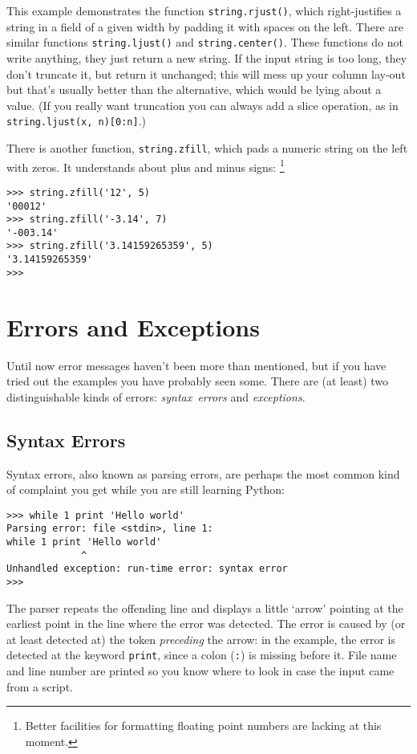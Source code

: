 This example demonstrates the function {\tt string.rjust()}, which
right-justifies a string in a field of a given width by padding it with
spaces on the left.  There are similar functions {\tt string.ljust()}
and {\tt string.center()}.  These functions do not write anything, they
just return a new string.  If the input string is too long, they don't
truncate it, but return it unchanged; this will mess up your column
lay-out but that's usually better than the alternative, which would be
lying about a value.  (If you really want truncation you can always add
a slice operation, as in {\tt string.ljust(x,~n)[0:n]}.)

There is another function, {\tt string.zfill}, which pads a numeric
string on the left with zeros.  It understands about plus and minus
signs:%
\footnote{
	Better facilities for formatting floating point numbers are
	lacking at this moment.
}

\bcode\begin{verbatim}
>>> string.zfill('12', 5)
'00012'
>>> string.zfill('-3.14', 7)
'-003.14'
>>> string.zfill('3.14159265359', 5)
'3.14159265359'
>>>
\end{verbatim}\ecode


\chapter{Errors and Exceptions}

Until now error messages haven't been more than mentioned, but if you
have tried out the examples you have probably seen some.  There are
(at least) two distinguishable kinds of errors: {\em syntax\ errors}
and {\em exceptions}.

\section{Syntax Errors}

Syntax errors, also known as parsing errors, are perhaps the most common
kind of complaint you get while you are still learning Python:

\bcode\begin{verbatim}
>>> while 1 print 'Hello world'
Parsing error: file <stdin>, line 1:
while 1 print 'Hello world'
             ^
Unhandled exception: run-time error: syntax error
>>> 
\end{verbatim}\ecode
%
The parser repeats the offending line and displays a little `arrow'
pointing at the earliest point in the line where the error was detected.
The error is caused by (or at least detected at) the token
{\em preceding}
the arrow: in the example, the error is detected at the keyword
{\tt print}, since a colon ({\tt :}) is missing before it.
File name and line number are printed so you know where to look in case
the input came from a script.

